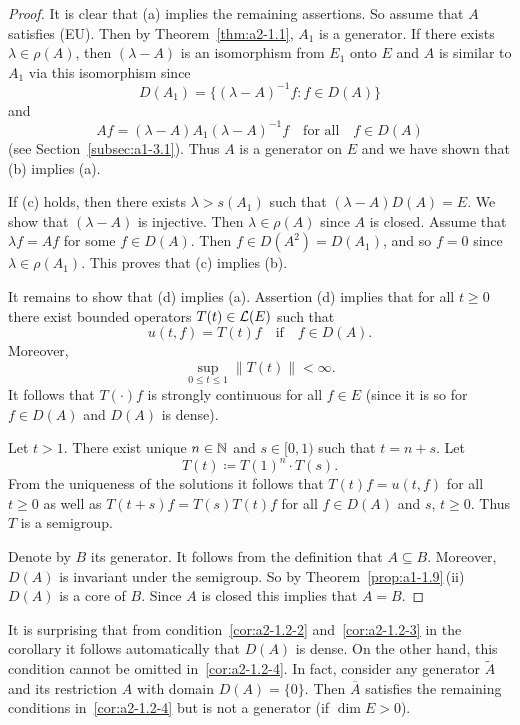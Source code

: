 \begin{proof}
It is clear that (a) implies the remaining assertions.
So assume that $A$ satisfies (EU).
Then by Theorem~\ref{thm:a2-1.1}, $A_{1}$ is a generator.
If there exists $\lambda \in \rho(A)$, then $(\lambda-A)$ is an isomorphism from $E_{1}$ onto $E$ and $A$ is similar to $A_{1}$ via this isomorphism since 
\[
D(A_{1}) = \{(\lambda-A)^{-1}f \colon f \in D(A)\}
\]
and 
%
\[
	Af = (\lambda-A)A_{1}(\lambda-A)^{-1}f
	\quad \text{for all} \quad f \in D(A)
\]
%
(see Section~\ref{subsec:a1-3.1}).
Thus $A$ is a generator on $E$ and we have shown that (b) implies (a).   

If (c)  holds, then there exists $\lambda > s(A_{1})$ such that $(\lambda-A)D(A) = E$.
We show that $(\lambda-A)$ is injective.
Then $\lambda \in \rho(A)$ since $A$ is closed.
Assume that $\lambda f = Af$ for some $f \in D(A)$.
Then $f \in D(A^{2}) = D(A_{1})$, and so $f = 0$ since $\lambda \in \rho(A_{1})$.
This proves that (c) implies (b).  

It remains to show that (d)  implies (a). 
Assertion (d) implies that for all $ t \geq 0 $ there exist bounded operators $ T(t) \in \mathcal{L}(E) $ such that 
%
\[
	u(t,f) = T(t)f 
	\quad \text{if} \quad 
	f \in D(A) .
\]
%
Moreover, 
%
\[
	\sup_{0 \leq t \leq 1} \|T(t)\| < \infty .
\]
%
It follows that $ T(\cdot)f $ is strongly continuous for all $ f \in E $ (since it is so for $ f \in D(A) $ and $ D(A) $ is dense).

Let $ t > 1 $.
There exist unique $ n \in \mathbb{N} $ and $ s \in [0,1) $ such that $ t = n + s $.
Let 
%
\[
	T(t) \coloneq T(1)^{n} \cdot T(s) .
\]
%
From the uniqueness of the solutions it follows that $ T(t)f = u(t,f) $ for all $ t \geq 0 $ as well as $ T(t+s)f = T(s)T(t)f $ for all $ f \in D(A) $ and $ s$, $t \geq 0 $.
Thus $ T $ is a semigroup.

Denote by $ B $ its generator.
It follows from the definition that $ A \subseteq B $.
Moreover, $ D(A) $ is invariant under the semigroup.
So by Theorem~\ref{prop:a1-1.9}\,(ii) $ D(A) $ is a core of\/ $ B $.
Since $ A $ is closed this implies that $ A = B $.
\end{proof}
\begin{remark}\label{rem:a2-1.3}
It is surprising that from condition~\ref{cor:a2-1.2-2}   and~\ref{cor:a2-1.2-3}   in the corollary it follows automatically that $ D(A) $ is dense.
On the other hand, this condition cannot be omitted in~\ref{cor:a2-1.2-4}.   
In fact, consider any generator $ \tilde{A} $ and its restriction $ A $ with domain $ D(A) = \{0\} $.
Then $ \overline{A} $ satisfies the remaining conditions in~\ref{cor:a2-1.2-4} but is not a generator (if\/ $ \dim E > 0 $).
\end{remark}
